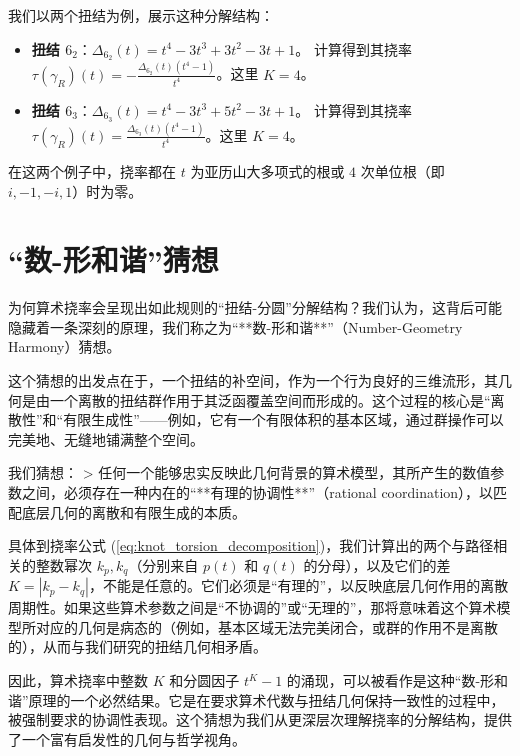 \documentclass[a4paper,12pt]{book}
\numberwithin{problem}{section}
\numberwithin{definition}{section}
\numberwithin{lemma}{section}
\numberwithin{proposition}{section}
\numberwithin{theorem}{section}
\numberwithin{grammar}{section}
\numberwithin{program}{section}
\numberwithin{convention}{section}
\numberwithin{corollary}{section}
\begin{document}
我们以两个扭结为例，展示这种分解结构：
\begin{itemize}
    \item \textbf{扭结 $6_2$}：$\Delta_{6_2}(t) = t^4 - 3t^3 + 3t^2 - 3t + 1$。
    计算得到其挠率 $\tau(\gamma_R)(t) = -\frac{\Delta_{6_2}(t)(t^4-1)}{t^4}$。这里 $K=4$。
    \item \textbf{扭结 $6_3$}：$\Delta_{6_3}(t) = t^4 - 3t^3 + 5t^2 - 3t + 1$。
    计算得到其挠率 $\tau(\gamma_R)(t) = \frac{\Delta_{6_3}(t)(t^4-1)}{t^4}$。这里 $K=4$。
\end{itemize}
在这两个例子中，挠率都在 $t$ 为亚历山大多项式的根或 $4$ 次单位根（即 $i, -1, -i, 1$）时为零。

\section{“数-形和谐”猜想}
\label{sec:number_geometry_harmony}

为何算术挠率会呈现出如此规则的“扭结-分圆”分解结构？我们认为，这背后可能隐藏着一条深刻的原理，我们称之为“**数-形和谐**”（Number-Geometry Harmony）猜想。

这个猜想的出发点在于，一个扭结的补空间，作为一个行为良好的三维流形，其几何是由一个离散的扭结群作用于其泛函覆盖空间而形成的。这个过程的核心是“离散性”和“有限生成性”——例如，它有一个有限体积的基本区域，通过群操作可以完美地、无缝地铺满整个空间。

我们猜想：
> 任何一个能够忠实反映此几何背景的算术模型，其所产生的数值参数之间，必须存在一种内在的“**有理的协调性**”（rational coordination），以匹配底层几何的离散和有限生成的本质。

具体到挠率公式 (\ref{eq:knot_torsion_decomposition})，我们计算出的两个与路径相关的整数幂次 $k_p, k_q$（分别来自 $p(t)$ 和 $q(t)$ 的分母），以及它们的差 $K=|k_p - k_q|$，不能是任意的。它们必须是“有理的”，以反映底层几何作用的离散周期性。如果这些算术参数之间是“不协调的”或“无理的”，那将意味着这个算术模型所对应的几何是病态的（例如，基本区域无法完美闭合，或群的作用不是离散的），从而与我们研究的扭结几何相矛盾。

因此，算术挠率中整数 $K$ 和分圆因子 $t^K-1$ 的涌现，可以被看作是这种“数-形和谐”原理的一个必然结果。它是在要求算术代数与扭结几何保持一致性的过程中，被强制要求的协调性表现。这个猜想为我们从更深层次理解挠率的分解结构，提供了一个富有启发性的几何与哲学视角。

\end{document}

